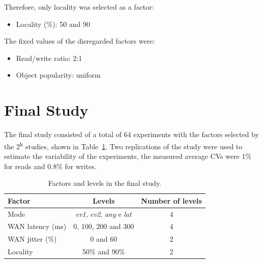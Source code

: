 \documentclass[doublespacing]{bmcart}
\begin{document}
Therefore, only locality was selected as a factor:

\begin{itemize}

\item Locality (\%): 50 and 90

\end{itemize}

The fixed values of the disregarded factors were:

\begin{itemize}

\item Read/write ratio: 2:1

\item Object popularity: uniform

\end{itemize}

\section{Final Study}

The final study consisted of a total of 64 experiments with the factors selected
by the 2\textsuperscript{k} studies, shown in
Table~\ref{tab:fatores_e_niveis_do_estudo_final}. Two replications of the study were used to
estimate the variability of the experiments, the measured average CVs
were 1\% for reads and 0.8\% for writes.

\begin{table}[h!]
\caption{Factors and levels in the final study.}
\begin{tabular}{lcc} \hline

Factor & Levels & Number of levels\\\hline

Mode & \textit{ev1}, \textit{ev2}, \textit{any} e \textit{lat} & 4\\

WAN latency (ms) & 0, 100, 200 and 300 & 4\\

WAN jitter (\%) & 0 and 60 & 2\\

Locality & 50\% and 90\% & 2\\\hline

\end{tabular}

\label{tab:fatores_e_niveis_do_estudo_final}

\end{table}
\end{document}
